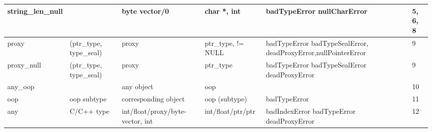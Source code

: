 \documentclass[letterpaper,10pt,english]{sphinxmanual}
\begin{document}
\begin{tabulary}{\linewidth}{p{2cm} p{2cm} p{2cm} p{2cm} p{3cm} p{2cm}}
string\_len\_null
 &  & 
byte vector/0
 & 
char *, int
 & 
badTypeError nullCharError
 & 
5, 6, 8
\\\hline

proxy
 & 
(ptr\_type, type\_seal)
 & 
proxy
 & 
ptr\_type, != NULL
 & 
badTypeError badTypeSealError, deadProxyError,nullPointerError
 & 
9
\\\hline

proxy\_null
 & 
(ptr\_type, type\_seal)
 & 
proxy
 & 
ptr\_type
 & 
badTypeError badTypeSealError deadProxyError
 & 
9
\\\hline

any\_oop
 &  & 
any object
 & 
oop
 &  & 
10
\\\hline

oop
 & 
oop subtype
 & 
corresponding object
 & 
oop (subtype)
 & 
badTypeError
 & 
11
\\\hline

any
 & 
C/C++ type
 & 
int/float/proxy/byte-vector, int
 & 
int/float/ptr/ptr
 & 
badIndexError badTypeError deadProxyError
 & 
12
\\\hline
\end{tabulary}
\end{document}
